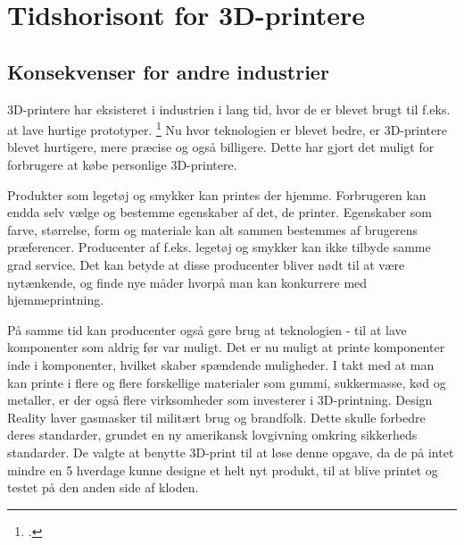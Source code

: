 
\chapter{Tidshorisont for 3D-printere}
\section{Konsekvenser for andre industrier}


3D-printere har eksisteret i industrien i lang tid, hvor de er blevet brugt til f.eks. at lave hurtige prototyper. \footcite[105]{manyika_disruptive_2013} Nu hvor teknologien er blevet bedre, er 3D-printere blevet hurtigere, mere præcise og også billigere. Dette har gjort det muligt for forbrugere at købe personlige 3D-printere. 


Produkter som legetøj og smykker kan printes der hjemme. Forbrugeren kan endda selv vælge og bestemme egenskaber af det, de printer. Egenskaber som farve, størrelse, form og materiale kan alt sammen bestemmes af brugerens præferencer. Producenter af f.eks. legetøj og smykker kan ikke tilbyde samme grad service. Det kan betyde at disse producenter bliver nødt til at være nytænkende, og finde nye måder hvorpå man kan konkurrere med hjemmeprintning.

På samme tid kan producenter også gøre brug at teknologien -{} til at lave komponenter som aldrig før var muligt. Det er nu muligt at printe komponenter inde i komponenter, hvilket skaber spændende muligheder.
I takt med at man kan printe i flere og flere forskellige materialer som gummi, sukkermasse, kød og metaller, er der også flere virksomheder som investerer i 3D-printning.
Design Reality laver gasmasker til militært brug og brandfolk. Dette skulle forbedre deres standarder, grundet en ny amerikansk lovgivning omkring sikkerheds standarder. De valgte at benytte 3D-print til at løse denne opgave, da de på intet mindre en 5 hverdage kunne designe et helt nyt produkt, til at blive printet og testet på den anden side af kloden. \autocite{3ders.org_design_2013}



